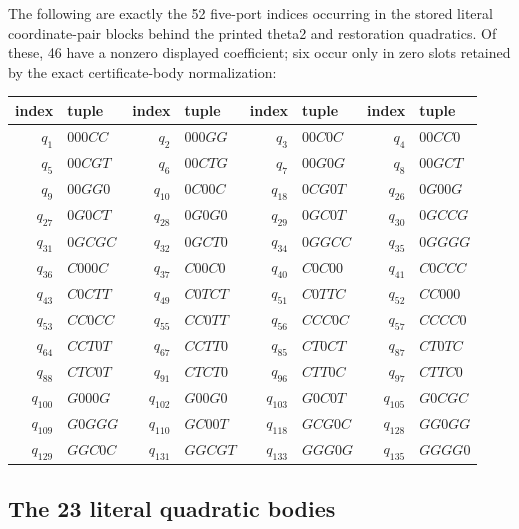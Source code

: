 The following are exactly the 52 five-port indices occurring in the stored
literal coordinate-pair blocks behind the printed theta2 and restoration
quadratics.  Of these, 46 have a nonzero displayed coefficient; six occur only
in zero slots retained by the exact certificate-body normalization:

\begin{center}\footnotesize
\begin{tabular}{r lr lr lr l}
\toprule
index & tuple & index & tuple & index & tuple & index & tuple\\
\midrule
$q_{1}$ & $000CC$ & $q_{2}$ & $000GG$ & $q_{3}$ & $00C0C$ & $q_{4}$ & $00CC0$\\
$q_{5}$ & $00CGT$ & $q_{6}$ & $00CTG$ & $q_{7}$ & $00G0G$ & $q_{8}$ & $00GCT$\\
$q_{9}$ & $00GG0$ & $q_{10}$ & $0C00C$ & $q_{18}$ & $0CG0T$ & $q_{26}$ & $0G00G$\\
$q_{27}$ & $0G0CT$ & $q_{28}$ & $0G0G0$ & $q_{29}$ & $0GC0T$ & $q_{30}$ & $0GCCG$\\
$q_{31}$ & $0GCGC$ & $q_{32}$ & $0GCT0$ & $q_{34}$ & $0GGCC$ & $q_{35}$ & $0GGGG$\\
$q_{36}$ & $C000C$ & $q_{37}$ & $C00C0$ & $q_{40}$ & $C0C00$ & $q_{41}$ & $C0CCC$\\
$q_{43}$ & $C0CTT$ & $q_{49}$ & $C0TCT$ & $q_{51}$ & $C0TTC$ & $q_{52}$ & $CC000$\\
$q_{53}$ & $CC0CC$ & $q_{55}$ & $CC0TT$ & $q_{56}$ & $CCC0C$ & $q_{57}$ & $CCCC0$\\
$q_{64}$ & $CCT0T$ & $q_{67}$ & $CCTT0$ & $q_{85}$ & $CT0CT$ & $q_{87}$ & $CT0TC$\\
$q_{88}$ & $CTC0T$ & $q_{91}$ & $CTCT0$ & $q_{96}$ & $CTT0C$ & $q_{97}$ & $CTTC0$\\
$q_{100}$ & $G000G$ & $q_{102}$ & $G00G0$ & $q_{103}$ & $G0C0T$ & $q_{105}$ & $G0CGC$\\
$q_{109}$ & $G0GGG$ & $q_{110}$ & $GC00T$ & $q_{118}$ & $GCG0C$ & $q_{128}$ & $GG0GG$\\
$q_{129}$ & $GGC0C$ & $q_{131}$ & $GGCGT$ & $q_{133}$ & $GGG0G$ & $q_{135}$ & $GGGG0$\\
\bottomrule
\end{tabular}
\end{center}

\subsection{The 23 literal quadratic bodies}

